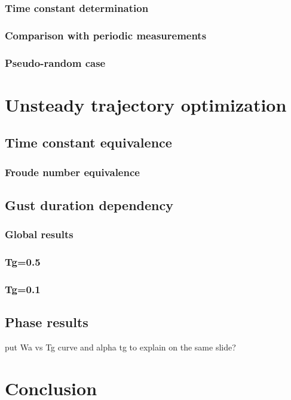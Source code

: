 \documentclass[compress]{beamer}
\begin{document}
\begin{frame}
  \frametitle{Time constant determination}
\end{frame}

\begin{frame}
  \frametitle{Comparison with periodic measurements}
\end{frame}

\begin{frame}
  \frametitle{Pseudo-random case}
\end{frame}


\section[Unsteady optimization]{Unsteady trajectory optimization}

\subsection{Time constant equivalence}

\begin{frame}
  \frametitle{Froude number equivalence}
\end{frame}

\subsection{Gust duration dependency}

\begin{frame}
  \frametitle{Global results}
\end{frame}

\begin{frame}
  \frametitle{Tg=0.5}
\end{frame}

\begin{frame}
  \frametitle{Tg=0.1}
\end{frame}


\subsection{Phase results}

\begin{frame}
  put Wa vs Tg curve and alpha tg to explain on the same slide?
\end{frame}

\section{Conclusion}
\end{document}

